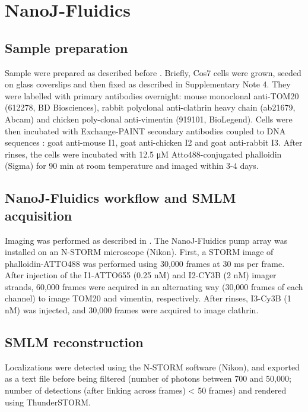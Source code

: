 \section{NanoJ-Fluidics}

\subsection{Sample preparation}

Sample were prepared as described before \cite{almada2018automating}. Briefly, Cos7 cells were grown, seeded on glass coverslips and then fixed as described in Supplementary Note 4. They were labelled with primary antibodies overnight: mouse monoclonal anti-TOM20 (612278, BD Biosciences), rabbit polyclonal anti-clathrin heavy chain (ab21679, Abcam) and chicken poly-clonal anti-vimentin (919101, BioLegend). Cells were then incubated with Exchange-PAINT secondary antibodies coupled to DNA sequences \cite{almada2018automating}: goat anti-mouse I1, goat anti-chicken I2 and goat anti-rabbit I3. After rinses, the cells were incubated with 12.5 μM Atto488-conjugated phalloidin (Sigma) for 90 min at room temperature and imaged within 3-4 days. 

\subsection{NanoJ-Fluidics workflow and SMLM acquisition}

Imaging was performed as described in \cite{almada2018automating}. The NanoJ-Fluidics pump array was installed on an N-STORM microscope (Nikon). First, a STORM image of phalloidin-ATTO488 was performed using 30,000 frames at 30 ms per frame. After injection of the I1-ATTO655 (0.25 nM) and I2-CY3B (2 nM) imager strands, 60,000 frames were acquired in an alternating way (30,000 frames of each channel) to image TOM20 and vimentin, respectively. After rinses, I3-Cy3B (1 nM) was injected, and 30,000 frames were acquired to image clathrin.

\subsection{SMLM reconstruction}

Localizations were detected using the N-STORM software (Nikon), and exported as a text file before being filtered (number of photons between 700 and 50,000; number of detections (after linking across frames) < 50 frames) and rendered using ThunderSTORM.

